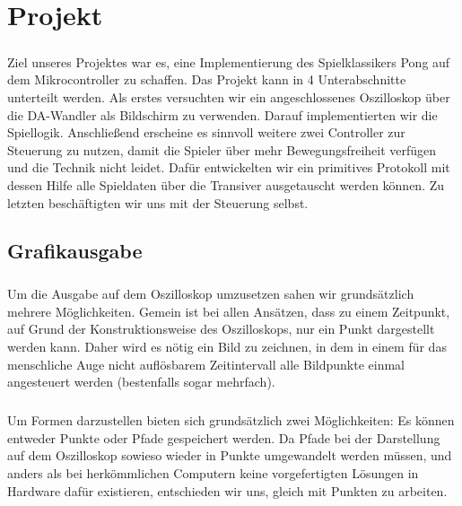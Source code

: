 \chapter{Projekt}

\paragraph*{}
Ziel unseres Projektes war es, eine Implementierung des Spielklassikers Pong auf dem Mikrocontroller zu schaffen. Das Projekt kann in 4 Unterabschnitte unterteilt werden. Als erstes versuchten wir ein angeschlossenes Oszilloskop über die DA-Wandler als Bildschirm zu verwenden. Darauf implementierten wir die Spiellogik. Anschließend erscheine es sinnvoll weitere zwei Controller zur Steuerung zu nutzen, damit die Spieler über mehr Bewegungsfreiheit verfügen und die Technik nicht leidet. Dafür entwickelten wir ein primitives Protokoll mit dessen Hilfe alle Spieldaten über die Transiver ausgetauscht werden können. Zu letzten beschäftigten wir uns mit der Steuerung selbst.

\section*{Grafikausgabe}

\paragraph*{}
Um die Ausgabe auf dem Oszilloskop umzusetzen sahen wir grundsätzlich mehrere Möglichkeiten. Gemein ist bei allen Ansätzen, dass zu einem Zeitpunkt, auf Grund der Konstruktionsweise des Oszilloskops, nur ein Punkt dargestellt werden kann. Daher wird es nötig ein Bild zu zeichnen, in dem in einem für das menschliche Auge nicht auflösbarem Zeitintervall alle Bildpunkte einmal angesteuert werden (bestenfalls sogar mehrfach).

\paragraph*{}
Um Formen darzustellen bieten sich grundsätzlich zwei Möglichkeiten: Es können entweder Punkte oder Pfade gespeichert werden. Da Pfade bei der Darstellung auf dem Oszilloskop sowieso wieder in Punkte umgewandelt werden müssen, und anders als bei herkömmlichen Computern keine vorgefertigten Lösungen in Hardware dafür existieren, entschieden wir uns, gleich mit Punkten zu arbeiten. 

